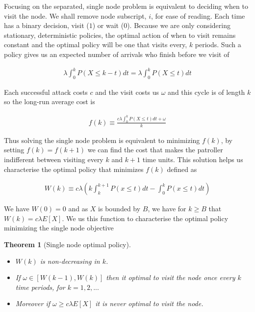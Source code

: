 \documentclass[a4paper,10pt]{article}
\newtheorem{theorem}{Theorem}[section]
\theoremstyle{definition}
\theoremstyle{definition}
\theoremstyle{remark}
\theoremstyle{definition}
\begin{document}
Focusing on the separated, single node problem is equivalent to deciding when to visit the node. We shall remove node subscript, $i$, for ease of reading. Each time has a binary decision, visit ($1$) or wait ($0$). Because we are only considering stationary, deterministic policies, the optimal action of when to visit remains constant and the optimal policy will be one that visits every, $k$ periods. Such a policy gives us an expected number of arrivals who finish before we visit of

\begin{align*}
\lambda \int_{0}^{k} P(X \leq k-t) dt= \lambda \int_{0}^{k} P(X \leq t) dt
\end{align*}

Each successful attack costs $c$ and the visit costs us $\omega$ and this cycle is of length $k$ so the long-run average cost is

\begin{align*}
f(k) \equiv \frac{c \lambda \int_{0}^{k} P(X \leq t) dt + \omega}{k}
\end{align*}

Thus solving the single node problem is equivalent to minimizing $f(k)$, by setting $f(k) = f(k+1)$ we can find the cost that makes the patroller indifferent between visiting every $k$ and $k+1$ time units. This solution helps us characterise the optimal policy that minimizes $f(k)$ defined as

\begin{align*}
W(k) \equiv c \lambda \left( k \int_{k}^{k+1} P(x \leq t) dt - \int_{0}^{k} P(x \leq t) dt \right)
\end{align*}

We have $W(0)=0$ and as $X$ is bounded by $B$, we have for $k \geq B$ that $W(k)= c \lambda E[X]$. We us this function to characterise the optimal policy minimizing the single node objective

\begin{theorem}[Single node optimal policy]
\label{Theorem:Single node optimal policy}
\begin{itemize}
\item[a)] $W(k)$ is non-decreasing in $k$.
\item[b)] If $\omega \in [W(k-1),W(k)]$ then it optimal to visit the node once every $k$ time periods, for $k=1,2,...$
\item[c)] Moreover if $\omega \geq c \lambda E[X]$ it is never optimal to visit the node.
\end{itemize}
\end{theorem}
\end{document}

